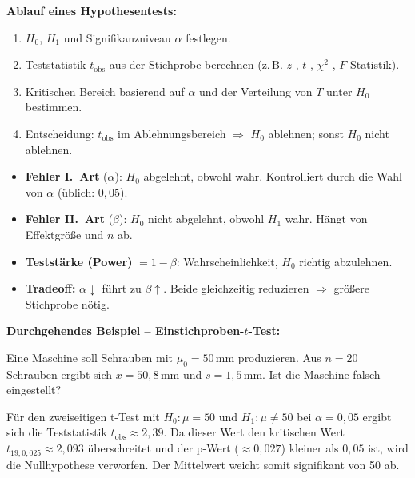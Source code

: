 \textbf{Ablauf eines Hypothesentests:}
\begin{enumerate}[leftmargin=1.5em]
    \item $H_0$, $H_1$ und Signifikanzniveau $\alpha$ festlegen.
    \item Teststatistik $t_{\text{obs}}$ aus der Stichprobe berechnen (z.\,B. $z$-, $t$-, $\chi^2$-, $F$-Statistik).
    \item Kritischen Bereich basierend auf $\alpha$ und der Verteilung von $T$ unter $H_0$ bestimmen.
    \item Entscheidung: $t_{\text{obs}}$ im Ablehnungsbereich $\Rightarrow$ $H_0$ ablehnen; sonst $H_0$ nicht ablehnen.
\end{enumerate}


\begin{itemize}[leftmargin=1.5em]
    \item \textbf{Fehler I.\ Art} ($\alpha$): $H_0$ abgelehnt, obwohl wahr. Kontrolliert durch die Wahl von $\alpha$ (üblich: $0{,}05$).
    \item \textbf{Fehler II.\ Art} ($\beta$): $H_0$ nicht abgelehnt, obwohl $H_1$ wahr. Hängt von Effektgröße und $n$ ab.
    \item \textbf{Teststärke (Power)} $= 1 - \beta$: Wahrscheinlichkeit, $H_0$ richtig abzulehnen.
    \item \textbf{Tradeoff:} $\alpha \downarrow$ führt zu $\beta \uparrow$. Beide gleichzeitig reduzieren $\Rightarrow$ größere Stichprobe nötig.
\end{itemize}

\medskip
\noindent\textbf{Durchgehendes Beispiel -- Einstichproben-$t$-Test:}

\noindent Eine Maschine soll Schrauben mit $\mu_0 = 50\,\text{mm}$ produzieren. Aus $n = 20$ Schrauben ergibt sich $\bar{x} = 50{,}8\,\text{mm}$ und $s = 1{,}5\,\text{mm}$. Ist die Maschine falsch eingestellt?

Für den zweiseitigen t-Test mit \(H_0:\mu=50\) und \(H_1:\mu\neq 50\) bei \(\alpha=0{,}05\) ergibt sich die Teststatistik \(t_{\text{obs}} \approx 2{,}39\). Da dieser Wert den kritischen Wert \(t_{19;0{,}025}\approx 2{,}093\) überschreitet und der p-Wert (\(\approx 0{,}027\)) kleiner als \(0{,}05\) ist, wird die Nullhypothese verworfen. Der Mittelwert weicht somit signifikant von 50 ab.

